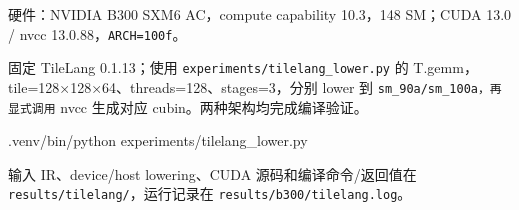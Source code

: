 \documentclass[11pt,a4paper,fontset=fandol]{ctexart}
\newenvironment{Shaded}{}{}
\newcommand{\ExtensionTok}[1]{#1}
\newcommand{\NormalTok}[1]{#1}
\begin{document}
\begin{answer}

硬件：NVIDIA B300 SXM6 AC，compute capability 10.3，148 SM；CUDA 13.0 /
nvcc 13.0.88，\texttt{ARCH=\allowbreak{}100f}。

固定 TileLang 0.1.13；使用
\texttt{experiments/\allowbreak{}tilelang\_\allowbreak{}lower.\allowbreak{}py}
的 T.gemm，tile=128×128×64、threads=128、stages=3，分别 lower 到
\texttt{sm\_\allowbreak{}90a/\allowbreak{}sm\_\allowbreak{}100a，再显式调用}
nvcc 生成对应 cubin。两种架构均完成编译验证。

\begin{Shaded}
\begin{Highlighting}[]
\ExtensionTok{.venv/bin/python}\NormalTok{ experiments/tilelang\_lower.py}
\end{Highlighting}
\end{Shaded}

输入 IR、device/host lowering、CUDA 源码和编译命令/返回值在
\texttt{results/\allowbreak{}tilelang/\allowbreak{}}，运行记录在
\texttt{results/\allowbreak{}b300/\allowbreak{}tilelang.\allowbreak{}log}。


\end{answer}
\end{document}
